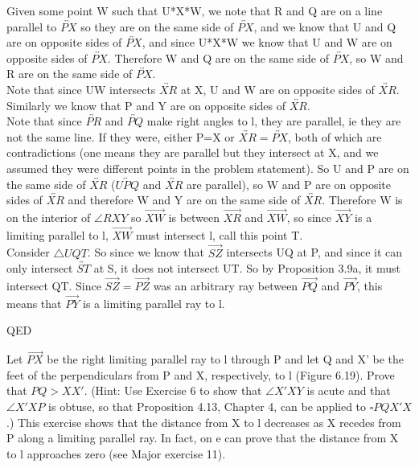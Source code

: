 \documentclass[12pt,letterpaper]{article}
\newcommand{\QED}{\begin{flushright}QED\end{flushright}}
\newcommand{\prob}[1]{\newpage\noindent {\bf #1}}
\begin{document}
Given some point W such that U*X*W, we note that R and Q are on a line parallel to $\overleftrightarrow{PX}$ so they are on the same side of $\overleftrightarrow{PX}$, and we know that U and Q are on opposite sides of $\overleftrightarrow{PX}$, and since U*X*W we know that U and W are on opposite sides of $\overleftrightarrow{PX}$.  Therefore W and Q are on the same side of $\overleftrightarrow{PX}$, so W and R are on the same side of $\overleftrightarrow{PX}$.  \\

Note that since UW intersects $\overleftrightarrow{XR}$ at X, U and W are on opposite sides of $\overleftrightarrow{XR}$.  Similarly we know that P and Y are on opposite sides of $\overleftrightarrow{XR}$.  \\





Note that since $\overleftrightarrow{PR}$ and $\overleftrightarrow{PQ}$ make right angles to l, they are parallel, ie they are not the same line.  If they were, either P=X or $\overleftrightarrow{XR} = \overleftrightarrow{PX}$, both of which are contradictions (one means they are parallel but they intersect at X, and we assumed they were different points in the problem statement). So U and P are on the same side of $\overleftrightarrow{XR}$ ($\overleftrightarrow{UPQ}$ and $\overleftrightarrow{XR}$ are parallel), so W and P are on opposite sides of $\overleftrightarrow{XR}$ and therefore W and Y are on the same side of $\overleftrightarrow{XR}$.  Therefore W is on the interior of $\angle RXY$ so $\overrightarrow{XW}$ is between $\overrightarrow{XR}$ and $\overrightarrow{XW}$, so since $\overrightarrow{XY}$ is a limiting parallel to l, $\overrightarrow{XW}$ must intersect l, call this point T.\\


Consider $\triangle UQT$. So since we know that $\overrightarrow{SZ}$ intersects UQ at P, and since it can only intersect $\overleftrightarrow{ST}$ at S, it does not intersect UT. So by Proposition 3.9a, it must intersect QT. Since $\overrightarrow{SZ} = \overrightarrow{PZ}$ was an arbitrary ray between $\overrightarrow{PQ}$ and $\overrightarrow{PY}$, this means that $\overrightarrow{PY}$ is a limiting parallel ray to l.


\QED







\prob{8 } Let $\overrightarrow{PX}$ be the right limiting parallel ray to l through P and let Q and X' be the feet of the perpendiculars from P and X, respectively, to l (Figure 6.19).  Prove that $PQ > XX'$. (Hint: Use Exercise 6 to show that $\angle X'XY$ is acute and that $\angle X'XP$ is obtuse, so that Proposition 4.13, Chapter 4, can be applied to $\square PQX'X$.) This exercise shows that the distance from X to l decreases as X recedes from P along a limiting parallel ray.  In fact, on e can prove that the distance from X to l approaches zero (see Major exercise 11).
\end{document}
